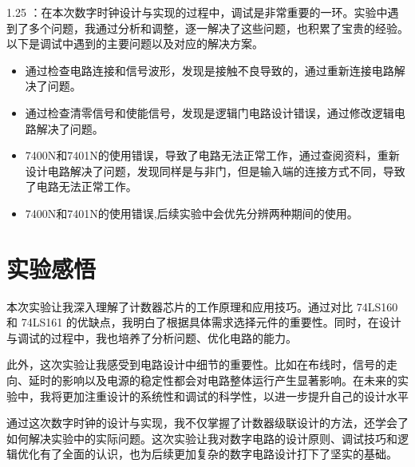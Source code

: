 \documentclass[12p,UTF8]{article}
\begin{document}
\begin{spacing}{1.25}
：\songti 在本次数字时钟设计与实现的过程中，调试是非常重要的一环。实验中遇到了多个问题，我通过分析和调整，逐一解决了这些问题，也积累了宝贵的经验。以下是调试中遇到的主要问题以及对应的解决方案。
    \begin{itemize}
      \item {} \songti 通过检查电路连接和信号波形，发现是接触不良导致的，通过重新连接电路解决了问题。
      \item {} \songti 通过检查清零信号和使能信号，发现是逻辑门电路设计错误，通过修改逻辑电路解决了问题。
      \item 7400N和7401N的使用错误，导致了电路无法正常工作，通过查阅资料，重新设计电路解决了问题，发现同样是与非门，但是输入端的连接方式不同，导致了电路无法正常工作。
      \item 7400N和7401N的使用错误,后续实验中会优先分辨两种期间的使用。
    \end{itemize}
  \section{实验感悟}

本次实验让我深入理解了计数器芯片的工作原理和应用技巧。通过对比 74LS160 和 74LS161 的优缺点，我明白了根据具体需求选择元件的重要性。同时，在设计与调试的过程中，我也培养了分析问题、优化电路的能力。

此外，这次实验让我感受到电路设计中细节的重要性。比如在布线时，信号的走向、延时的影响以及电源的稳定性都会对电路整体运行产生显著影响。在未来的实验中，我将更加注重设计的系统性和调试的科学性，以进一步提升自己的设计水平

通过这次数字时钟的设计与实现，我不仅掌握了计数器级联设计的方法，还学会了如何解决实验中的实际问题。这次实验让我对数字电路的设计原则、调试技巧和逻辑优化有了全面的认识，也为后续更加复杂的数字电路设计打下了坚实的基础。



\end{spacing}
\end{document}
